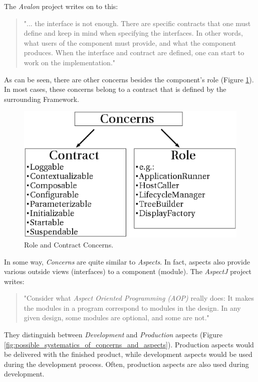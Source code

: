\documentclass[a4paper,10pt]{llncs}
\begin{document}
The \emph{Avalon} project \cite{jakarta} writes on to this:
\begin{quotation}
"... the interface is not enough. There are specific
contracts that one must define and keep in mind when specifying the interfaces.
In other words, what users of the component must provide, and what the component
produces. When the interface and contract are defined, one can start to work on
the implementation."
\end{quotation}
As can be seen, there are other concerns besides the component's role (Figure
\ref{fig:role_and_contract_concerns}). In most cases, these concerns belong
to a contract that is defined by the surrounding Framework.

\begin{figure}[ht]
\begin{center}
\includegraphics[scale=0.3]{role_and_contract_concerns}
\caption{Role and Contract Concerns.}
\label{fig:role_and_contract_concerns}
\end{center}
\end{figure}

In some way, \emph{Concerns} are quite similar to \emph{Aspects}. In fact,
aspects also provide various outside views (interfaces) to a component (module).
The \emph{AspectJ} project \cite{aspectj} writes:
\begin{quotation}
"Consider what \emph{Aspect Oriented Programming (AOP)} really does:
It makes the modules in a program correspond to modules in the design.
In any given design, some modules are optional, and some are not."
\end{quotation}

They distinguish between \emph{Development} and \emph{Production} aspects
(Figure \ref{fig:possible_systematics_of_concerns_and_aspects}).
Production aspects would be delivered with the finished product, while development aspects
would be used during the development process. Often, production aspects are also
used during development.
\end{document}
